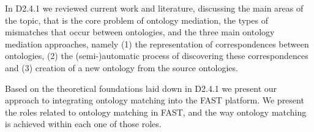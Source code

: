 \documentclass{fast_latex}
\begin{document}
In D2.4.1 we reviewed current work and literature, discussing the main areas of the topic, that is the core problem of ontology mediation, the types of mismatches that occur between ontologies, and the three main ontology mediation approaches, namely (1) the representation of correspondences between ontologies, (2) the (semi-)automatic process of discovering these correspondences and (3) creation of a new ontology from the source ontologies. 

Based on the theoretical foundations laid down in D2.4.1 we present our approach to integrating ontology matching into the FAST platform. We present the roles related to ontology matching in FAST, and the way ontology matching is achieved within each one of those roles.

\newpage


\clearpage
\end{document}
